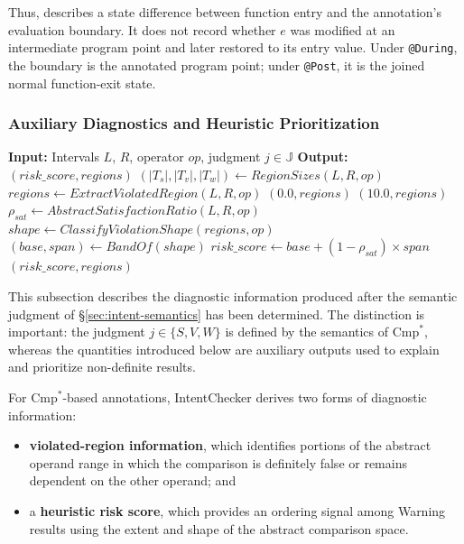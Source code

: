 \documentclass[pdflatex,sn-basic]{sn-jnl}%
\theoremstyle{thmstyleone}%
\theoremstyle{thmstyletwo}%
\theoremstyle{thmstylethree}%
\begin{document}
Thus,  describes a state difference between function entry
and the annotation's evaluation boundary.
It does not record whether $e$ was modified at an intermediate program point
and later restored to its entry value.
Under \texttt{@During}, the boundary is the annotated program point;
under \texttt{@Post}, it is the joined normal function-exit state.

\subsubsection{Auxiliary Diagnostics and Heuristic Prioritization}
\label{sec:validation-engine}

\begin{algorithm}[!t]
\caption{Auxiliary Diagnostics for $\mathrm{Cmp}^*$-based Annotations}
\label{alg:risk-score}
\begin{algorithmic}[1]
\State \textbf{Input:} Intervals $L$, $R$, operator $op$, judgment $j \in \mathbb{J}$
\State \textbf{Output:} $(\mathit{risk\_score},\mathit{regions})$
\State $(|T_s|,|T_v|,|T_w|) \gets \mathit{RegionSizes}(L,R,op)$
\State $\mathit{regions} \gets \mathit{ExtractViolatedRegion}(L,R,op)$
    \State \Return $(0.0,\mathit{regions})$
    \State \Return $(10.0,\mathit{regions})$
\EndIf
\State $\rho_{\mathit{sat}} \gets
       \mathit{AbstractSatisfactionRatio}(L,R,op)$
\State $\mathit{shape} \gets
       \mathit{ClassifyViolationShape}(\mathit{regions},op)$
\State $(\mathit{base},\mathit{span}) \gets
       \mathit{BandOf}(\mathit{shape})$
\State $\mathit{risk\_score}
       \gets \mathit{base}
       + (1-\rho_{\mathit{sat}})\times\mathit{span}$
\State \Return $(\mathit{risk\_score},\mathit{regions})$
\end{algorithmic}
\end{algorithm}

This subsection describes the diagnostic information produced after the
semantic judgment of \S\ref{sec:intent-semantics} has been determined.
The distinction is important: the judgment
$j\in\{S,V,W\}$ is defined by the semantics of $\mathrm{Cmp}^*$,
whereas the quantities introduced below are auxiliary outputs used to explain
and prioritize non-definite results.

For $\mathrm{Cmp}^*$-based annotations, IntentChecker derives two forms of
diagnostic information:
\begin{itemize}
    \item \textbf{violated-region information}, which identifies portions of
    the abstract operand range in which the comparison is definitely false or
    remains dependent on the other operand; and

    \item a \textbf{heuristic risk score}, which provides an ordering signal
    among Warning results using the extent and shape of the abstract
    comparison space.
\end{itemize}
\end{document}
